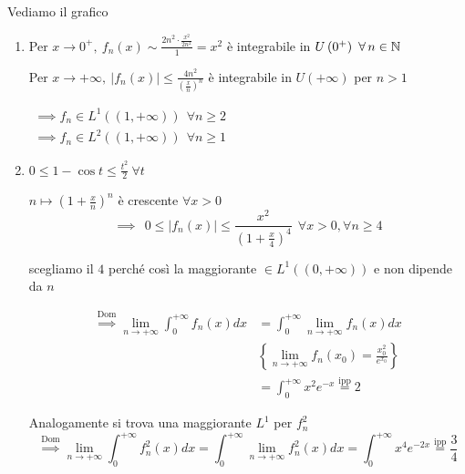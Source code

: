 Vediamo il grafico

\begin{enumerate}
\item Per $x\rightarrow 0^{+}, \ f_{n}(x) \sim \frac{2n^{2} \cdot \frac{x^{2}}{2n^{2}}}{1} = x^{2}$ è integrabile in $U\left(0^{+}\right) \ \forall n\in \NN $

Per $x\rightarrow + \infty, \ | f_{n}(x)| \leq \frac{4n^{2}}{\left(\frac{x}{n}\right)^{n}}$ è integrabile in $U(+ \infty)$ per $n > 1$

$
\begin{array}{l}
\implies f_{n} \in L^{1}((1, + \infty)) \ \ \forall n \geq 2\\
\implies f_{n} \in L^{2}((1, + \infty)) \ \ \forall n \geq 1
\end{array}$
\item $0 \leq 1 - \cos t \leq \frac{t^{2}}{2} \ \forall t$

$n\mapsto \left(1 + \frac{x}{n}\right)^{n}$ è crescente $\forall x > 0$
\begin{equation*}
\implies \ \ 0 \leq | f_{n} (x)| \leq \frac{x^{2}}{\left(1 + \frac{x}{4}\right)^{4}} \ \ \forall x > 0, \forall n \geq 4
\end{equation*}

scegliamo il $4$ perché così la maggiorante $\in L^{1}((0, + \infty))$ e non dipende da $n$

\begin{equation*}
\begin{aligned}
\overset{\text{Dom}}{\implies}\lim\limits_{n\rightarrow + \infty}\int^{+ \infty}_{0} f_{n}(x) dx & = \int^{+ \infty}_{0}\lim\limits_{n\rightarrow + \infty} f_{n}(x) dx\\
 & \left\{\lim\limits_{n\rightarrow + \infty} f_{n}(x_{0}) = \frac{x^{2}_{0}}{e^{x_{0}}}\right\}\\
 & = \int^{+ \infty}_{0} x^{2} e^{- x}\overset{\text{ipp}}{=} 2
\end{aligned}
\end{equation*}

Analogamente si trova una maggiorante $L^{1}$ per $f^{2}_{n}$
\begin{equation*}
\overset{\text{Dom}}{\implies}\lim\limits_{n\rightarrow + \infty}\int^{+ \infty}_{0} f^{2}_{n}(x) dx = \int^{+ \infty}_{0}\lim\limits_{n\rightarrow + \infty} f^{2}_{n}(x) dx = \int^{+ \infty}_{0} x^{4} e^{- 2x}\overset{\text{ipp}}{=}\frac{3}{4}
\end{equation*}
\end{enumerate}
